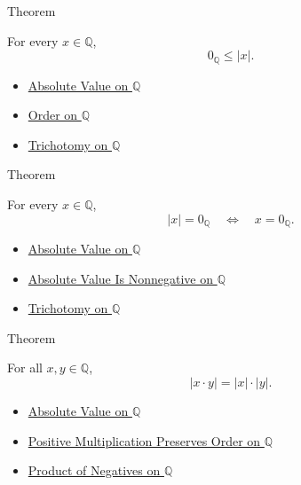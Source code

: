\begin{theorembox}{Theorem}
\begin{theorem}
\label{thm:absolute-value-nonnegative-on-q}
For every $x\in\mathbb{Q}$,
\[
0_{\mathbb{Q}}\le |x|.
\]
\end{theorem}
\end{theorembox}

\begin{dependencies}
\begin{itemize}
  \item \hyperref[def:absolute-value-on-q]{Absolute Value on $\mathbb{Q}$}
  \item \hyperref[def:order-on-q]{Order on $\mathbb{Q}$}
  \item \hyperref[thm:trichotomy-on-q]{Trichotomy on $\mathbb{Q}$}
\end{itemize}
\end{dependencies}

\begin{theorembox}{Theorem}
\begin{theorem}
\label{thm:absolute-value-zero-iff-on-q}
For every $x\in\mathbb{Q}$,
\[
|x|=0_{\mathbb{Q}}
\quad\Longleftrightarrow\quad
x=0_{\mathbb{Q}}.
\]
\end{theorem}
\end{theorembox}

\begin{dependencies}
\begin{itemize}
  \item \hyperref[def:absolute-value-on-q]{Absolute Value on $\mathbb{Q}$}
  \item \hyperref[thm:absolute-value-nonnegative-on-q]{Absolute Value Is Nonnegative on $\mathbb{Q}$}
  \item \hyperref[thm:trichotomy-on-q]{Trichotomy on $\mathbb{Q}$}
\end{itemize}
\end{dependencies}

\begin{theorembox}{Theorem}
\begin{theorem}
\label{thm:absolute-value-multiplicative-on-q}
For all $x,y\in\mathbb{Q}$,
\[
|x\cdot y|=|x|\cdot |y|.
\]
\end{theorem}
\end{theorembox}

\begin{dependencies}
\begin{itemize}
  \item \hyperref[def:absolute-value-on-q]{Absolute Value on $\mathbb{Q}$}
  \item \hyperref[thm:positive-multiplication-preserves-order-on-q]{Positive Multiplication Preserves Order on $\mathbb{Q}$}
  \item \hyperref[cor:product-of-negatives-on-q]{Product of Negatives on $\mathbb{Q}$}
\end{itemize}
\end{dependencies}

